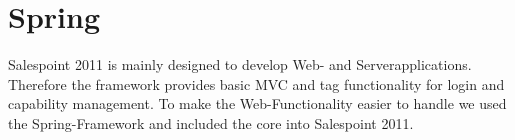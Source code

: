 \section{Spring}
Salespoint 2011 is mainly designed to develop Web- and Serverapplications. Therefore the framework provides basic MVC and tag functionality for login and capability management. To make the Web-Functionality easier to handle we used the Spring-Framework and included the core into Salespoint 2011.
